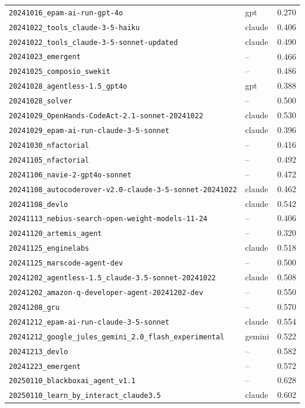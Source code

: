 \begin{center}
\begin{longtable}{llc}
\texttt{20241016\_epam-ai-run-gpt-4o} & gpt & 0.270 \\
\texttt{20241022\_tools\_claude-3-5-haiku} & claude & 0.406 \\
\texttt{20241022\_tools\_claude-3-5-sonnet-updated} & claude & 0.490 \\
\texttt{20241023\_emergent} & -- & 0.466 \\
\texttt{20241025\_composio\_swekit} & -- & 0.486 \\
\texttt{20241028\_agentless-1.5\_gpt4o} & gpt & 0.388 \\
\texttt{20241028\_solver} & -- & 0.500 \\
\texttt{20241029\_OpenHands-CodeAct-2.1-sonnet-20241022} & claude & 0.530 \\
\texttt{20241029\_epam-ai-run-claude-3-5-sonnet} & claude & 0.396 \\
\texttt{20241030\_nfactorial} & -- & 0.416 \\
\texttt{20241105\_nfactorial} & -- & 0.492 \\
\texttt{20241106\_navie-2-gpt4o-sonnet} & -- & 0.472 \\
\texttt{20241108\_autocoderover-v2.0-claude-3-5-sonnet-20241022} & claude & 0.462 \\
\texttt{20241108\_devlo} & claude & 0.542 \\
\texttt{20241113\_nebius-search-open-weight-models-11-24} & -- & 0.406 \\
\texttt{20241120\_artemis\_agent} & -- & 0.320 \\
\texttt{20241125\_enginelabs} & claude & 0.518 \\
\texttt{20241125\_marscode-agent-dev} & -- & 0.500 \\
\texttt{20241202\_agentless-1.5\_claude-3.5-sonnet-20241022} & claude & 0.508 \\
\texttt{20241202\_amazon-q-developer-agent-20241202-dev} & -- & 0.550 \\
\texttt{20241208\_gru} & -- & 0.570 \\
\texttt{20241212\_epam-ai-run-claude-3-5-sonnet} & claude & 0.554 \\
\texttt{20241212\_google\_jules\_gemini\_2.0\_flash\_experimental} & gemini & 0.522 \\
\texttt{20241213\_devlo} & -- & 0.582 \\
\texttt{20241223\_emergent} & -- & 0.572 \\
\texttt{20250110\_blackboxai\_agent\_v1.1} & -- & 0.628 \\
\texttt{20250110\_learn\_by\_interact\_claude3.5} & claude & 0.602 \\

\end{longtable}
\end{center}
